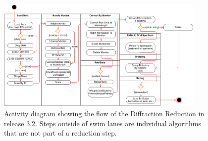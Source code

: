 \documentclass[paper=a4, fontsize=11pt]{scrartcl}	%
\numberwithin{equation}{section}															%
\numberwithin{figure}{section}																%
\numberwithin{table}{section}																%
\begin{document}
\begin{figure}[H]
\centering
\includegraphics[width=0.9\textwidth]{img/uml/activity_diagrams/DiffractionReduction_activity.png}
\caption{Activity diagram showing the flow of the Diffraction Reduction in release 3.2. Steps outside of swim lanes are individual algorithms that are not part of a reduction step.}
\label{fig:c2e-class-diagram}
\end{figure}
\end{document}
